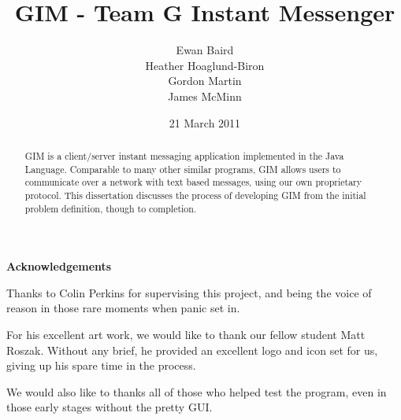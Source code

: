\documentclass{l3proj}
\makeatletter
\newcommand\ackname{Acknowledgements}
\newenvironment{acknowledgements}{%
      \titlepage
      \null\vfil
      \@beginparpenalty\@lowpenalty
      \begin{center}%
        \bfseries \ackname
        \@endparpenalty\@M
      \end{center}}%
     {\par\vfil\null\endtitlepage}
\newenvironment{acknowledgements}{%
      \if@twocolumn
        \section*{\abstractname}%
      \else
        \small
        \begin{center}%
          {\bfseries \ackname\vspace{-.5em}\vspace{\z@}}%
        \end{center}%
        \quotation
      \fi}
      {\if@twocolumn\else\endquotation\fi}
\makeatother
\begin{document}
\title{GIM - Team G Instant Messenger}
\author{Ewan Baird \\
Heather Hoaglund-Biron \\
Gordon Martin \\
James McMinn}
\date{21 March 2011}
\maketitle

\begin{abstract}
GIM is a client/server instant messaging application implemented in the Java Language. Comparable to many other similar programs, GIM allows users to communicate over a network with text based messages, using our own proprietary protocol. This dissertation discusses the process of developing GIM from the initial problem definition, though to completion.
\end{abstract}

\begin{acknowledgements}
Thanks to Colin Perkins for supervising this project, and being the voice of reason in those rare moments when panic set in.

For his excellent art work, we would like to thank our fellow student Matt Roszak. Without any brief, he provided an excellent logo and icon set for us, giving up his spare time in the process.

We would also like to thanks all of those who helped test the program, even in those early stages without the pretty GUI.
\end{acknowledgements}

\educationalconsent

\tableofcontents

















\end{document}
